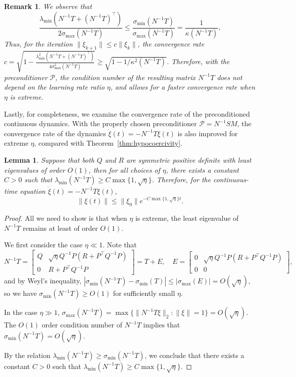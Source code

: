 \documentclass[11pt]{article}
\newtheorem{lemma}[theorem]{Lemma}
\newtheorem{remark}[theorem]{Remark}
\newcommand{\1}{\mathds{1}}
\begin{document}
\begin{remark}
    We observe that 
\begin{equation}
    \frac{\lambda_{\min}(N^{-1}T+(N^{-1}T)^\top)}{2\sigma_{\max}(N^{-1}T)}\leq \frac{\sigma_{\min}(N^{-1}T)}{\sigma_{\max}(N^{-1}T)} = \frac{1}{\kappa(N^{-1}T)},
\end{equation}
Thus, for the iteration $\|\xi_{k+1}\|\leq c \|\xi_k\|$, the convergence rate $c = \sqrt{1- \frac{\lambda_{\min}^2(N^{-1}T+(N^{-1}T)^\top)}{4\sigma_{\max}^2(N^{-1}T)}}\geq \sqrt{1-1/\kappa^2(N^{-1}T)}$. Therefore, with the preconditioner $\mathcal{P}$, the condition number of the resulting matrix $N^{-1}T$  does not depend on the learning rate ratio $\eta$, and allows for a faster convergence rate when $\eta$ is extreme.
\end{remark}

Lastly, for completeness, we examine the convergence rate of the preconditioned continuous dynamics. With the properly chosen preconditioner $\mathcal{P} = N^{-1}SM$, the convergence rate of the dynamics $\dot{\xi}(t) = -N^{-1}T \xi(t)$ is also improved for extreme $\eta$, compared with Theorem~\ref{thm:hypocoercivity}. 
\begin{lemma}
   Suppose that both $Q$ and $R$ are symmetric positive definite with least eigenvalues of order $O(1)$, then for all choices of $\eta$, there exists a constant $C>0$ such that $\lambda_{\min}(N^{-1}T)\geq C\max\{1,\sqrt{\eta}\}$. Therefore, for the continuous-time equation $\dot{\xi}(t) = -N^{-1}T \xi(t)$, $$\|\xi(t)\|\leq \|\xi_0\|e^{-C\max\{1,\sqrt{\eta}\}t}.$$ 
\end{lemma}
\begin{proof}
    All we need to show is that when $\eta$ is extreme, the least eigenvalue of $N^{-1}T$ remains at least of order $O(1)$. 
    
    We first consider the case $\eta\ll1$. Note that
    $$N^{-1}T = \begin{bmatrix}
        Q & \sqrt{\eta} Q^{-1}P(R+P^\top Q^{-1} P)\\
        0 &  R+P^\top Q^{-1} P 
    \end{bmatrix} = T + E,\quad E = \begin{bmatrix}
        0 & \sqrt{\eta} Q^{-1}P(R+P^\top Q^{-1} P)\\
        0 &  0
    \end{bmatrix},$$
    and by Weyl's inequality, $|\sigma_{\min}(N^{-1}T)-\sigma_{\min}(T)|\leq |\sigma_{\max}(E)|= O(\sqrt{\eta})$, so we have $\sigma_{\min}(N^{-1}T)\geq O(1)$ for sufficiently small $\eta$.

    In the case $\eta\gg 1$, $\sigma_{\max}(N^{-1}T)= \max\{ \|N^{-1}T\xi\|_2:\|\xi\|=1\} = O(\sqrt{\eta})$. The $O(1)$ order condition number of $N^{-1} T$ implies that $\sigma_{\min}(N^{-1}T)=O(\sqrt{\eta})$.

    By the relation $\lambda_{\min}(N^{-1}T)\geq \sigma_{\min}(N^{-1}T)$, we conclude that there exists a constant $C>0$ such that $\lambda_{\min}(N^{-1}T)\geq C\max\{1,\sqrt{\eta}\}$.
\end{proof}
\end{document}
